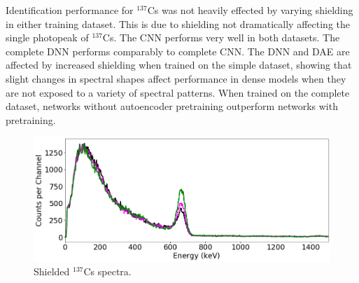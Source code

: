Identification performance for $^{137}$Cs was not heavily effected by varying shielding in either training dataset. This is due to shielding not dramatically affecting the single photopeak of $^{137}$Cs. The CNN performs very well in both datasets. The complete DNN performs comparably to complete CNN. The DNN and DAE are affected by increased shielding when trained on the simple dataset, showing that slight changes in spectral shapes affect performance in dense models when they are not exposed to a variety of spectral patterns. When trained on the complete dataset, networks without autoencoder pretraining outperform networks with pretraining.



\begin{figure}[H]
	\centering
	\includegraphics[width=1.0\linewidth]{images/shielded_cs137}
	\caption{Shielded $^{137}$Cs spectra.}
	\label{fig:shielded_cs137}
\end{figure}


